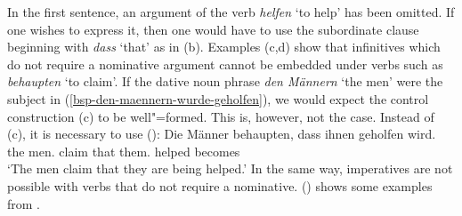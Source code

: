 \eal
{}
\zl
%
In the first sentence, an argument of the verb \emph{helfen} `to help' has been omitted. If one wishes to express it, then one would have to use
the subordinate clause beginning with \emph{dass} `that' as in (b). Examples (c,d) show that infinitives which do not require a nominative argument cannot be embedded
under verbs such as \emph{behaupten} `to claim'. If the dative noun phrase \emph{den Männern} `the
men' were the subject in (\ref{bsp-den-maennern-wurde-geholfen}), we would expect the control
construction (c) to be well"=formed. This is, however, not the case. Instead of (c), it is necessary to use ():
\ea
\gll Die Männer behaupten, dass ihnen geholfen wird.\\
	 the men.\nom{} claim that them.\dat{} helped becomes\\
\glt `The men claim that they are being helped.'
\z
%
In the same way, imperatives are not possible with verbs that do not require a nominative. () shows some examples from \citet[]{Reis82}.
\eal
{}
